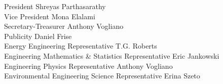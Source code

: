 President \hfill Shreyas Parthasarathy \\
Vice President \hfill Mona Elalami \\
Secretary-Treasurer \hfill Anthony Vogliano \\
Publicity \hfill Daniel Frise \\
Energy Engineering Representative \hfill T.G. Roberts \\
Engineering Mathematics \& Statistics Representative \hfill Eric Jankowski \\
Engineering Physics Representative \hfill Anthony Vogliano \\
Environmental Engineering Science Representative \hfill Erina Szeto

